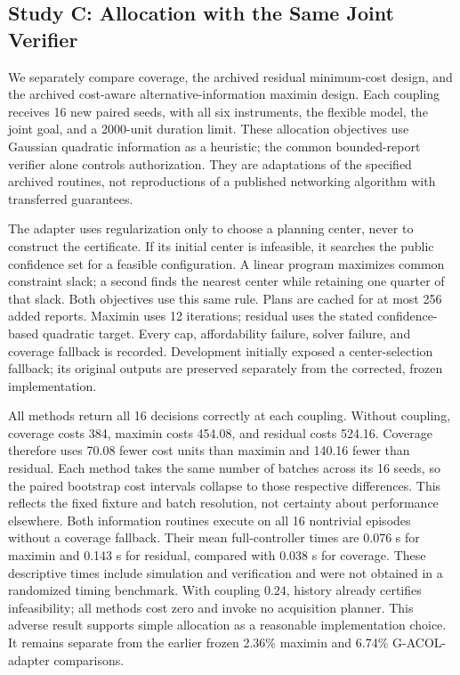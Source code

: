 \subsection{Study C: Allocation with the Same Joint Verifier}

We separately compare coverage, the archived residual minimum-cost design,
and the archived cost-aware alternative-information maximin design. Each
coupling receives 16 new paired seeds, with all six instruments, the flexible
model, the joint goal, and a 2000-unit duration limit. These allocation
objectives use Gaussian quadratic information as a heuristic; the common
bounded-report verifier alone controls authorization. They are adaptations
of the specified archived routines, not reproductions of a published
networking algorithm with transferred guarantees.

The adapter uses regularization only to choose a planning center, never to
construct the certificate. If its initial center is infeasible, it searches
the public confidence set for a feasible configuration. A linear program
maximizes common constraint slack; a second finds the nearest center while
retaining one quarter of that slack. Both objectives use this same rule.
Plans are cached for at most 256 added reports. Maximin uses 12 iterations;
residual uses the stated confidence-based quadratic target. Every cap,
affordability failure, solver failure, and coverage fallback is recorded.
Development initially exposed a center-selection fallback; its original
outputs are preserved separately from the corrected, frozen implementation.

All methods return all 16 decisions correctly at each coupling.
Without coupling, coverage costs 384, maximin costs 454.08, and residual
costs 524.16. Coverage therefore uses 70.08 fewer cost units than maximin
and 140.16 fewer than residual. Each method takes the same number of
batches across its 16 seeds, so the paired bootstrap cost intervals collapse
to those respective differences. This reflects the fixed fixture and batch
resolution, not certainty about performance elsewhere. Both information
routines execute on all 16 nontrivial episodes without a coverage fallback.
Their mean full-controller times are 0.076 s for maximin and 0.143 s for
residual, compared with 0.038 s for coverage. These descriptive times include
simulation and verification and were not obtained in a randomized timing
benchmark. With coupling $0.24$, history already certifies infeasibility;
all methods cost zero and invoke no acquisition planner. This adverse result
supports simple allocation as a reasonable implementation choice. It remains
separate from the earlier frozen 2.36\% maximin and 6.74\% G-ACOL-adapter
comparisons.

